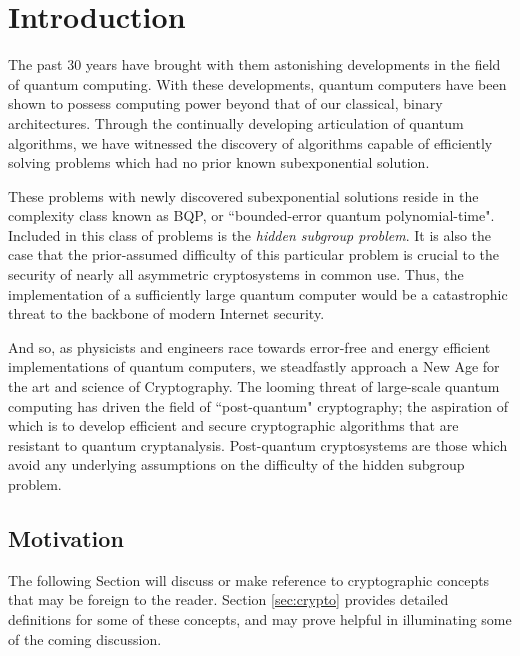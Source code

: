 \chapter{Introduction}

The past 30 years have brought with them astonishing developments in the field of quantum computing. With these developments, quantum computers have been shown to possess computing power beyond that of our classical, binary architectures. Through the continually developing articulation of quantum algorithms, we have witnessed the discovery of algorithms capable of efficiently solving problems which had no prior known subexponential solution. 

These problems with newly discovered subexponential solutions reside in the complexity class known as BQP, or ``bounded-error quantum polynomial-time". Included in this class of problems is the \textit{hidden subgroup problem}. It is also the case that the prior-assumed difficulty of this particular problem is crucial to the security of nearly all asymmetric cryptosystems in common use. Thus, the implementation of a sufficiently large quantum computer would be a catastrophic threat to the backbone of modern Internet security.  

And so, as physicists and engineers race towards error-free and energy efficient implementations of quantum computers, we steadfastly approach a New Age for the art and science of Cryptography. The looming threat of large-scale quantum computing has driven the field of ``post-quantum" cryptography; the aspiration of which is to develop efficient and secure cryptographic algorithms that are resistant to quantum cryptanalysis. Post-quantum cryptosystems are those which avoid any underlying assumptions on the difficulty of the hidden subgroup problem.\\

\section{Motivation}
\label{sec:motivation}

The following Section will discuss or make reference to cryptographic concepts that may be foreign to the reader. Section  \ref{sec:crypto} provides detailed definitions for some of these concepts, and may prove helpful in illuminating some of the coming discussion.\\

